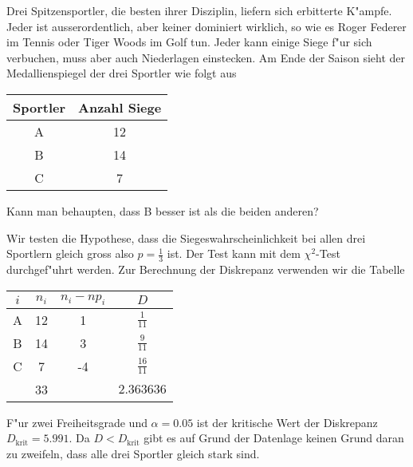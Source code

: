 Drei Spitzensportler, die besten ihrer Disziplin, liefern sich erbitterte
K"ampfe. Jeder ist ausserordentlich, aber keiner dominiert wirklich,
so wie es Roger Federer im Tennis oder Tiger Woods im Golf tun. Jeder
kann einige Siege f"ur sich verbuchen, muss aber auch Niederlagen
einstecken. Am Ende der Saison sieht der Medallienspiegel der drei
Sportler wie folgt aus
\begin{center}
\begin{tabular}{|c|c|}
\hline
Sportler&Anzahl Siege\\
\hline
A&12\\
B&14\\
C&7\\
\hline
\end{tabular}
\end{center}
Kann man behaupten, dass B besser ist als die beiden anderen?

\begin{loesung}
Wir testen die Hypothese, dass die Siegeswahrscheinlichkeit bei allen
drei Sportlern gleich gross also $p=\frac13$ ist. Der Test kann mit
dem $\chi^2$-Test durchgef"uhrt werden. Zur Berechnung der Diskrepanz
verwenden wir die Tabelle
\begin{center}
\begin{tabular}{|c|c|c|c|}
\hline
$i$&$n_i$&$n_i-np_i$&$D$\\
\hline
A&12&1&$\frac{1}{11}$\\
B&14&3&$\frac{9}{11}$\\
C& 7&-4&$\frac{16}{11}$\\
\hline
&33&&$2.363636$\\
\hline
\end{tabular}
\end{center}
F"ur zwei Freiheitsgrade und $\alpha=0.05$ ist der kritische Wert der
Diskrepanz $D_{\text{krit}}=5.991$. Da $D<D_{\text{krit}}$ gibt es
auf Grund der Datenlage keinen Grund daran zu zweifeln, dass alle drei
Sportler gleich stark sind.
\end{loesung}

